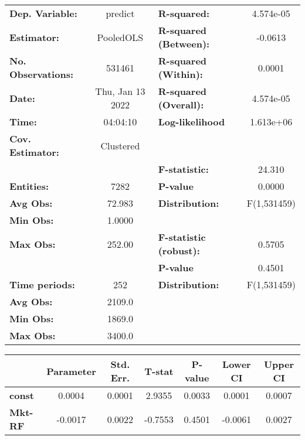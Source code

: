 \begin{center}
\begin{tabular}{lclc}
\toprule
\textbf{Dep. Variable:}    &      predict       & \textbf{  R-squared:         }   &    4.574e-05     \\
\textbf{Estimator:}        &     PooledOLS      & \textbf{  R-squared (Between):}  &     -0.0613      \\
\textbf{No. Observations:} &       531461       & \textbf{  R-squared (Within):}   &      0.0001      \\
\textbf{Date:}             &  Thu, Jan 13 2022  & \textbf{  R-squared (Overall):}  &    4.574e-05     \\
\textbf{Time:}             &      04:04:10      & \textbf{  Log-likelihood     }   &    1.613e+06     \\
\textbf{Cov. Estimator:}   &     Clustered      & \textbf{                     }   &                  \\
\textbf{}                  &                    & \textbf{  F-statistic:       }   &      24.310      \\
\textbf{Entities:}         &        7282        & \textbf{  P-value            }   &      0.0000      \\
\textbf{Avg Obs:}          &       72.983       & \textbf{  Distribution:      }   &   F(1,531459)    \\
\textbf{Min Obs:}          &       1.0000       & \textbf{                     }   &                  \\
\textbf{Max Obs:}          &       252.00       & \textbf{  F-statistic (robust):} &      0.5705      \\
\textbf{}                  &                    & \textbf{  P-value            }   &      0.4501      \\
\textbf{Time periods:}     &        252         & \textbf{  Distribution:      }   &   F(1,531459)    \\
\textbf{Avg Obs:}          &       2109.0       & \textbf{                     }   &                  \\
\textbf{Min Obs:}          &       1869.0       & \textbf{                     }   &                  \\
\textbf{Max Obs:}          &       3400.0       & \textbf{                     }   &                  \\
\bottomrule
\end{tabular}
\begin{tabular}{lcccccc}
                & \textbf{Parameter} & \textbf{Std. Err.} & \textbf{T-stat} & \textbf{P-value} & \textbf{Lower CI} & \textbf{Upper CI}  \\
\midrule
\textbf{const}  &       0.0004       &       0.0001       &      2.9355     &      0.0033      &       0.0001      &       0.0007       \\
\textbf{Mkt-RF} &      -0.0017       &       0.0022       &     -0.7553     &      0.4501      &      -0.0061      &       0.0027       \\
\bottomrule
\end{tabular}
\end{center}
